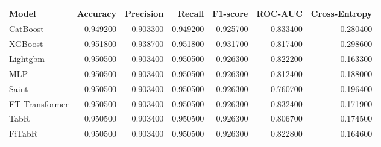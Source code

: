 \begin{tabular}{lrrrrrr}
\toprule
Model & Accuracy & Precision & Recall & F1-score & ROC-AUC & Cross-Entropy \\
\midrule
CatBoost & 0.949200 & 0.903300 & 0.949200 & 0.925700 & 0.833400 & 0.280400 \\
XGBoost & 0.951800 & 0.938700 & 0.951800 & 0.931700 & 0.817400 & 0.298600 \\
Lightgbm & 0.950500 & 0.903400 & 0.950500 & 0.926300 & 0.822200 & 0.163300 \\
MLP & 0.950500 & 0.903400 & 0.950500 & 0.926300 & 0.812400 & 0.188000 \\
Saint & 0.950500 & 0.903400 & 0.950500 & 0.926300 & 0.760700 & 0.196400 \\
FT-Transformer & 0.950500 & 0.903400 & 0.950500 & 0.926300 & 0.832400 & 0.171900 \\
TabR & 0.950500 & 0.903400 & 0.950500 & 0.926300 & 0.806700 & 0.174500 \\
FiTabR & 0.950500 & 0.903400 & 0.950500 & 0.926300 & 0.822800 & 0.164600 \\
\bottomrule
\end{tabular}

